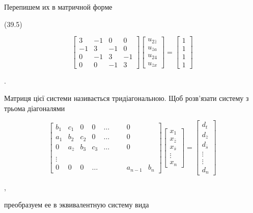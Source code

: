 \documentclass[
  ukrainian,
]{article}
\begin{document}
Перепишем их в матричной форме

(39.5)

\[
\begin{bmatrix} 3 & -1 & 0 & 0 \\ -1 & 3 & -1 & 0 \\ 0 & -1 & 3 & -1 \\ 0 & 0 & -1 & 3 \end{bmatrix}
\begin{bmatrix} u_{2\bar{z}} \\ u_{\bar{z}a} \\ u_{24} \\ u_{\bar{z}x} \end{bmatrix}
=
\begin{bmatrix} 1 \\ 1 \\ 1 \\ 1 \end{bmatrix}
\]

.

Матриця цієї системи називається тридіагональною. Щоб розв'язати систему
з трьома діагоналями

\[
\begin{bmatrix} b_1 & c_1 & 0 & 0 & \dots & & & 0 \\ a_1 & b_2 & c_2 & 0 & \dots & & & 0 \\ 0 & a_{\bar{z}} & b_3 & c_3 & \dots & & & 0 \\ & & & & & & & & \\ \vdots & & & & & & & & \\ 0 & 0 & 0 & \dots & & & & a_{n-1} & b_n \end{bmatrix}
\begin{bmatrix} x_1 \\ x_{\bar{z}} \\ x_{\bar{s}} \\ \vdots \\ x_n \end{bmatrix}
=
\begin{bmatrix} d_t \\ d_{\bar{z}} \\ d_{\bar{s}} \\ \vdots \\ \vdots \\ d_n \end{bmatrix}
\]

,

преобразуем ее в эквивалентную систему вида
\end{document}
